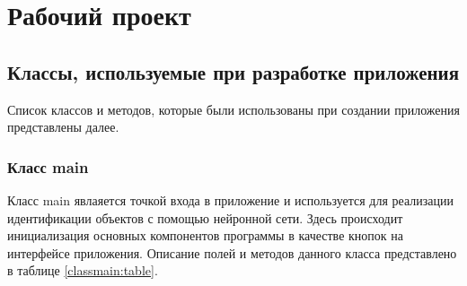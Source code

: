 \section{Рабочий проект}
\subsection{Классы, используемые при разработке приложения}

Список классов и методов, которые были использованы при создании приложения представлены далее.

\subsubsection{Класс main}

Класс main явлаяется точкой входа в приложение и используется для реализации идентификации объектов с помощью нейронной сети. Здесь происходит инициализация основных компонентов программы в качестве кнопок на интерфейсе приложения. 
Описание полей и методов данного класса представлено в таблице \ref{classmain:table}.

